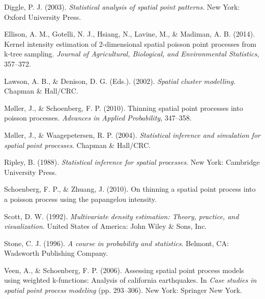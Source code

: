 \documentclass[12pt,twoside]{reedthesis}
\begin{document}
  Diggle, P. J. (2003). \emph{Statistical analysis of spatial point
  patterns}. New York: Oxford University Press.
  
  Ellison, A. M., Gotelli, N. J., Hsiang, N., Lavine, M., \& Madiman, A.
  B. (2014). Kernel intensity estimation of 2-dimensional spatial poisson
  point processes from k-tree sampling. \emph{Journal of Agricultural,
  Biological, and Environmental Statistics}, 357--372.
  
  Lawson, A. B., \& Denison, D. G. (Eds.). (2002). \emph{Spatial cluster
  modelling}. Chapman \& Hall/CRC.
  
  M{ø}ller, J., \& Schoenberg, F. P. (2010). Thinning spatial point
  processes into poisson processes. \emph{Advances in Applied
  Probability}, 347--358.
  
  M{ø}ller, J., \& Waagepetersen, R. P. (2004). \emph{Statistical
  inference and simulation for spatial point processes}. Chapman \&
  Hall/CRC.
  
  Ripley, B. (1988). \emph{Statistical inference for spatial processes}.
  New York: Cambridge University Press.
  
  Schoenberg, F. P., \& Zhuang, J. (2010). On thinning a spatial point
  process into a poisson process using the papangelou intensity.
  
  Scott, D. W. (1992). \emph{Multivariate density estimation: Theory,
  practice, and visualization}. United States of America: John Wiley \&
  Sons, Inc.
  
  Stone, C. J. (1996). \emph{A course in probability and statistics}.
  Belmont, CA: Wadsworth Publishing Company.
  
  Veen, A., \& Schoenberg, F. P. (2006). Assessing spatial point process
  models using weighted k-functions: Analysis of california earthquakes.
  In \emph{Case studies in spatial point process modeling} (pp. 293--306).
  New York: Springer New York.


\end{document}
